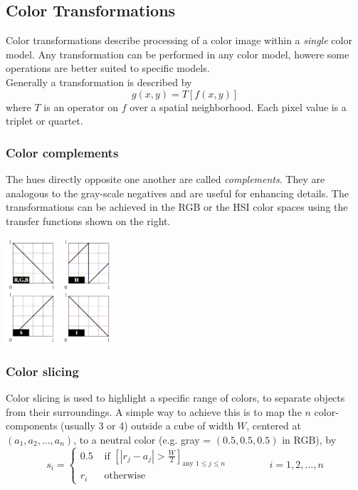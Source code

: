 \subsection{Color Transformations }
Color transformations describe processing of a color image within a \textit{single} color model. Any transformation can be performed in any color model, howere some operations are better suited to specific models. \\

Generally a transformation is described by 
\begin{equation}
	g(x,y) = T\left[f(x,y)\right]
\end{equation}
where $T$ is an operator on $f$ over a spatial neighborhood. Each pixel value is a triplet or quartet. \\

\subsubsection{Color complements }
\begin{minipage}{12cm}
	The hues directly opposite one another are called \textit{complements}. They are analogous to the gray-scale negatives and are useful for enhancing details. The transformations can be achieved in the RGB or the HSI color spaces using the transfer functions shown on the right.
\end{minipage}
\begin{minipage}{6cm}
	\centering
	\includegraphics[width=4cm]{images/ColorComplements.jpeg}
\end{minipage}

\subsubsection{Color slicing }
Color slicing is used to highlight a specific range of colors, to separate objects from their surroundings. A simple way to achieve this is to map the $n$ color-components (usually 3 or 4) outside a cube of width $W$, centered at $(a_1,a_2,\dots,a_n)$, to a neutral color (e.g. gray = $(0.5,0.5,0.5)$ in RGB), by
\begin{equation}
	s_i = \begin{cases}
		0.5 & \text{  if } \left[ \left| r_j - a_j \right| > \frac{W}{2} \right]_{\text{any } 1 \leq j \leq n} \\
		r_i & \text{  otherwise}
	\end{cases} \qquad \qquad i = 1,2,\dots,n
\end{equation}


